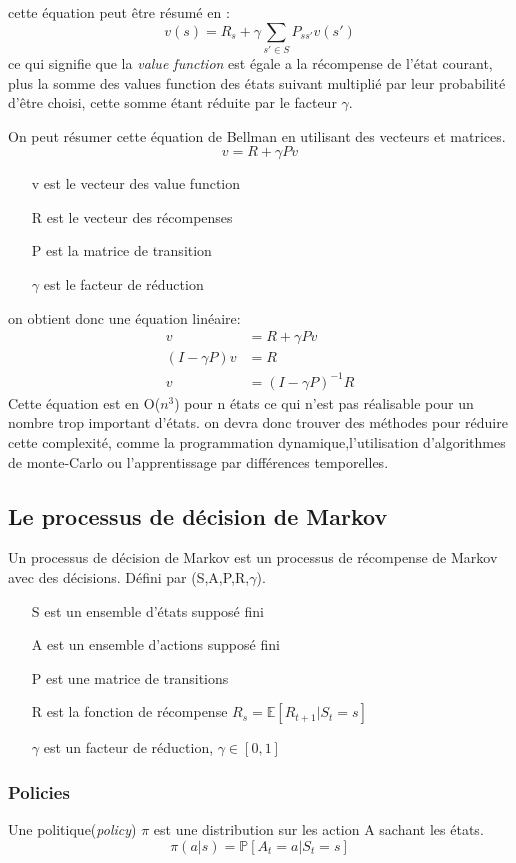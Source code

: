 \documentclass[a4paper,10pt]{article}
\begin{document}
cette équation peut être résumé en :
\[v(s)=R_s + \gamma \sum_{s'\in S} P_{ss'}v(s')\]
ce qui signifie que la \textit{value function} est égale a la récompense de l'état courant, plus la somme des values function des états suivant multiplié par leur probabilité d'être choisi, cette somme étant réduite par le facteur $\gamma$.\par
On peut résumer cette équation de Bellman en utilisant des vecteurs et matrices.
\[v=R+\gamma Pv\]
\begin{itemize}
\item[v] est le vecteur des value function
\item[R] est le vecteur des récompenses
\item[P] est la matrice de transition
\item[$\gamma$] est le facteur de réduction
\end{itemize}
on obtient donc une équation linéaire:
\[
\begin{aligned}
v &= R+ \gamma P v\\
(I - \gamma P)v &= R\\
v &= (I - \gamma P)^{-1} R
\end{aligned}
\]
Cette équation est en O($n^3$) pour n états ce qui n'est pas réalisable pour un nombre trop important d'états. on devra donc trouver des méthodes pour réduire cette complexité, comme la programmation dynamique,l'utilisation d'algorithmes de monte-Carlo ou l'apprentissage par différences temporelles.
\subsection{Le processus de décision de Markov}
Un processus de décision de Markov est un processus de récompense de Markov avec des décisions. Défini par (S,A,P,R,$\gamma$).
\begin{itemize}
\item[S] est un ensemble d'états supposé fini
\item[A] est un ensemble d'actions supposé fini
\item[P] est une matrice de transitions 
\item[R] est la fonction de récompense $R_s = \mathbb{E}[R_{t+1}|S_t =s]$
\item[$\gamma$] est un facteur de réduction, $\gamma \in [0,1]$
\end{itemize}
\vspace{12pt}
\subsubsection{Policies}
Une politique(\textit{policy}) $\pi$ est une distribution sur les action A sachant les états.
\[
\pi (a|s) = \mathbb{P}[A_t = a | S_t =s]
\]
\end{document}
